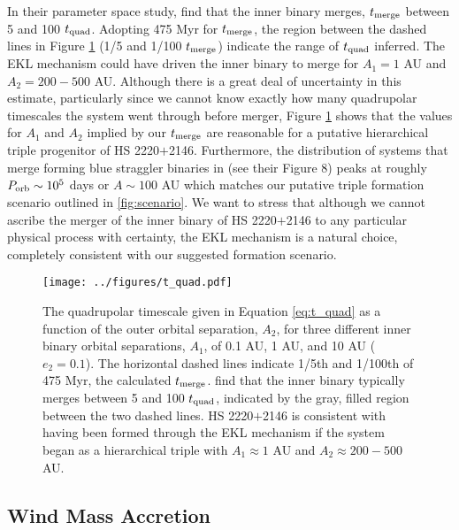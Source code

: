 \documentclass{emulateapj}
\begin{document}
In their parameter space study, \citet{naoz14} find that the inner binary merges, $t_{\rm merge}$ between 5 and 100 $t_{\rm quad}$. Adopting 475 Myr for $t_{\rm merge}$, the region between the dashed lines in Figure \ref{fig:t_quad} (1/5 and 1/100 $t_{\rm merge}$) indicate the range of $t_{\rm quad}$ inferred. The EKL mechanism could have driven the inner binary to merge for $A_1 = 1$ AU and $A_2 = 200 - 500$ AU. Although there is a great deal of uncertainty in this estimate, particularly since we cannot know exactly how many quadrupolar timescales the system went through before merger, Figure \ref{fig:t_quad} shows that the values for $A_1$ and $A_2$ implied by our $t_{\rm merge}$ are reasonable for a putative hierarchical triple progenitor of HS 2220$+$2146. Furthermore, the distribution of systems that merge forming blue straggler binaries in \citet{naoz14} (see their Figure 8) peaks at roughly $P_{\rm orb} \sim 10^5$ days or $A \sim 100$ AU which matches our putative triple formation scenario outlined in \ref{fig:scenario}. We want to stress that although we cannot ascribe the merger of the inner binary of HS 2220$+$2146 to any particular physical process with certainty, the EKL mechanism is a natural choice, completely consistent with our suggested formation scenario.


\begin{figure}[]
\begin{center}
\texttt{[image: ../figures/t\_quad.pdf]}
\caption{ The quadrupolar timescale given in Equation \ref{eq:t_quad} as a function of the outer orbital separation, $A_2$, for three different inner binary orbital separations, $A_1$, of 0.1 AU, 1 AU, and 10 AU ($e_2=0.1$). The horizontal dashed lines indicate 1/5th and 1/100th of 475 Myr, the calculated $t_{\rm merge}$. \citet{naoz13} find that the inner binary typically merges between 5 and 100 $t_{\rm quad}$, indicated by the gray, filled region between the two dashed lines. HS 2220$+$2146 is consistent with having been formed through the EKL mechanism if the system began as a hierarchical triple with $A_1 \approx 1$ AU and $A_2 \approx 200-500$ AU. }
\label{fig:t_quad}
\end{center}
\end{figure}


\subsection{Wind Mass Accretion}
\end{document}
